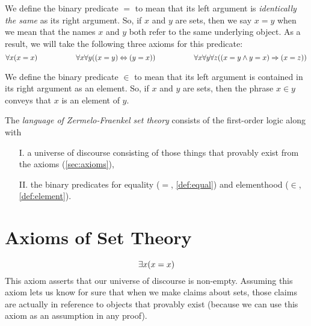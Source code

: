 \begin{definition}[Equality]\label{def:equal}
    We define the binary predicate \(=\) to mean that
    its left argument is \emph{identically the same} as its right argument.
    So, if \(x\) and \(y\) are sets, then we say \(x = y\)
    when we mean that the names \(x\) and \(y\) both refer to the same underlying object.
    As a result, we will take the following three axioms for this predicate:
    \vspace{-\parskip}
    \[
        \forall x \pn*{x = x}
        ~~~~~~~~~~~~~~~~
        \forall x \forall y \pn*{\pn*{x = y} \iff \pn*{y = x}}
        ~~~~~~~~~~~~~~~~
        \forall x \forall y \forall z \pn*{\pn*{x = y \meet y = x} \implies \pn*{x = z}}
    \]
    \vspace{-\parskip-\abovedisplayskip}
\end{definition}

\begin{definition}[Elementhood]\label{def:element}
    We define the binary predicate \(\in\) to mean that its left argument is
    contained in its right argument as an element.
    So, if \(x\) and \(y\) are sets, then the phrase \(x \in y\)
    conveys that \(x\) is an element of \(y\).
\end{definition}

\begin{definition}
    The \emph{language of Zermelo-Fraenkel set theory}
    consists of the first-order logic
    along with
    \begin{enumerate}
        \item[I.]
            a universe of discourse consisting of
            those things that provably exist from the axioms (\autoref{sec:axioms}),
        \item[II.]
            the binary predicates for equality (\(=\), \autoref{def:equal})
            and elementhood (\(\in\), \autoref{def:element}).
    \end{enumerate}
\end{definition}

\section{Axioms of Set Theory}\label{sec:axioms}

\setcounter{preaxiom}{-1}
\begin{axiom}[Existence]\label{ax:existence}
    \vspace{-\abovedisplayskip}
    \[
        \exists x \pn*{x = x}
    \]
    This axiom asserts that our universe of discourse is non-empty.
    Assuming this axiom lets us know for sure that when we make claims about sets,
    those claims are actually in reference to objects that provably exist
    (because we can use this axiom as an assumption in any proof).
\end{axiom}

